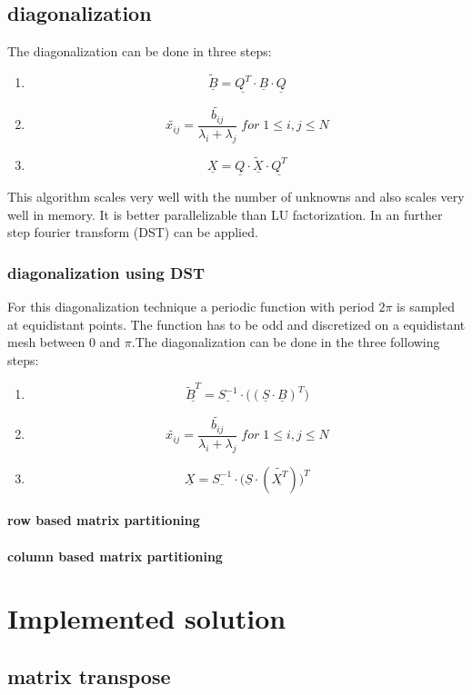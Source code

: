 \documentclass{article}
\begin{document}
\subsection{diagonalization}
The diagonalization can be done in three steps:
\begin{enumerate}
\item $$\underline{\tilde{B}}=\underline{Q^T}\cdot\underline{B}\cdot\underline{Q}$$
\item $$\tilde{x_{ij}}=\frac{\tilde{b_{ij}}}{\lambda_i+\lambda_j}\;for\;1\leq i,j \leq N$$
\item $$\underline{X}=\underline{Q}\cdot\underline{\tilde{X}}\cdot\underline{Q^T}$$
\end{enumerate}
This algorithm scales very well with the number of unknowns and also scales very well in memory. It is better parallelizable than LU factorization. In an further step fourier transform (DST) can be applied.
\subsubsection{diagonalization using DST}
For this diagonalization technique a periodic function with period $2\pi$ is sampled at equidistant points. The function has to be odd and discretized on a equidistant mesh between 0 and $\pi$.The diagonalization can be done in the three following steps:
\begin{enumerate}
\item $$ \underline{\tilde{B}^T}=\underline{S^{-1}}\cdot\big((\underline{S}\cdot\underline{B})^T\big)$$
\item $$ \tilde{x_{ij}}=\frac{\tilde{b_{ij}}}{\lambda_i+\lambda_j}\;for\;1\leq i,j\leq N$$
\item $$ \underline{X}=\underline{S^{-1}}\cdot\big(\underline{S}\cdot(\underline{\tilde{X^T}})\big)^T$$
\end{enumerate}
\paragraph{row based matrix partitioning}
\paragraph{column based matrix partitioning}
\section{Implemented solution}
\subsection{matrix transpose}
\end{document}
